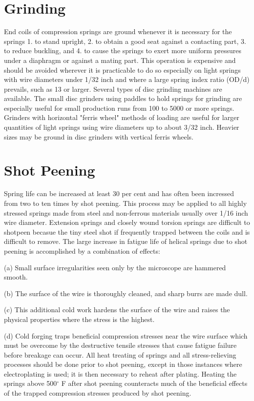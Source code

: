 \documentclass[10pt]{article}
\begin{document}
\section{Grinding} %
End coils of compression springs are ground whenever it is necessary for the springs 1. to stand upright, 2. to obtain a good seat against a contacting part, 3. to reduce buckling, and 4. to cause the springs to exert more uniform pressures under a diaphragm or against a mating part. 
This operation is expensive and should be avoided wherever it is practicable to do so especially on light springs with wire diameters under 1/32 inch and where a large spring index ratio (OD/d) prevails, such as 13 or larger.
Several types of disc grinding machines are available.
The small disc grinders using paddles to hold springs for grinding are especially useful for small production runs from 100 to 5000 or more springs.
Grinders with horizontal "ferris wheel" methods of loading are useful for larger quantities of light springs using wire diameters up to about 3/32 inch.
Heavier sizes may be ground in disc grinders with vertical ferris wheels.

\section{Shot Peening} %
Spring life can be increased at least 30 per cent and has often been incressed from two to ten times by shot peening.
This process may be applied to all highly stressed springs made from steel and non-ferrous materials usually over 1/16 inch wire diameter.
Extension springs and closely wound torsion springs are difficult to shotpeen becasue the tiny steel shot if frequently trapped between the coils and is difficult to remove.
The large increase in fatigue life of helical springs due to shot peening is accomplished by a combination of effects:

(a) Small surface irregularities seen only by the microscope are hammered smooth.

(b) The surface of the wire is thoroughly cleaned, and sharp burrs are made dull.

(c) This additional cold work hardens the surface of the wire and raises the physical properties where the stress is the highest.

(d) Cold forging traps beneficial compression stresses near the wire surface which must be overcome by the destructive tensile stresses that cause fatigue failure before breakage can occur.
All heat treating of springs and all stress-relieving processes should be done prior to shot peening, except in those instances where electroplating is used; it is then necessary to reheat after plating.
Heating the springs above 500$^\circ$ F after shot peening counteracts much of the beneficial effects of the trapped compression stresses produced by shot peening.
\end{document}

